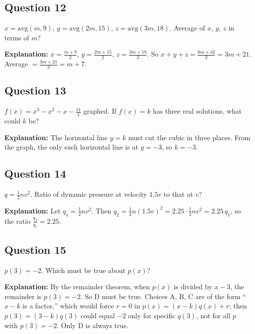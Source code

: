 \subsection*{Question 12}
$x = \text{avg}(m, 9)$, $y = \text{avg}(2m, 15)$, $z = \text{avg}(3m, 18)$. Average of $x$, $y$, $z$ in terms of $m$?

\textbf{Explanation:} $x = \frac{m+9}{2}$, $y = \frac{2m+15}{2}$, $z = \frac{3m+18}{2}$. So $x + y + z = \frac{6m + 42}{2} = 3m + 21$. Average $= \frac{3m+21}{3} = m + 7$.

\subsection*{Question 13}
$f(x) = x^3 - x^2 - x - \frac{11}{4}$ graphed. If $f(x) = k$ has three real solutions, what could $k$ be?

\textbf{Explanation:} The horizontal line $y = k$ must cut the cubic in three places. From the graph, the only such horizontal line is at $y = -3$, so $k = -3$.

\subsection*{Question 14}
$q = \frac{1}{2}nv^2$. Ratio of dynamic pressure at velocity $1.5v$ to that at $v$?

\textbf{Explanation:} Let $q_1 = \frac{1}{2}n v^2$. Then $q_2 = \frac{1}{2}n (1.5v)^2 = 2.25 \cdot \frac{1}{2}n v^2 = 2.25\, q_1$, so the ratio $\frac{q_2}{q_1} = 2.25$.

\subsection*{Question 15}
$p(3) = -2$. Which must be true about $p(x)$?

\textbf{Explanation:} By the remainder theorem, when $p(x)$ is divided by $x - 3$, the remainder is $p(3) = -2$. So D must be true. Choices A, B, C are of the form ``$x - k$ is a factor,'' which would force $r = 0$ in $p(x) = (x - k)q(x) + r$; then $p(3) = (3-k)q(3)$ could equal $-2$ only for specific $q(3)$, not for all $p$ with $p(3) = -2$. Only D is always true.
